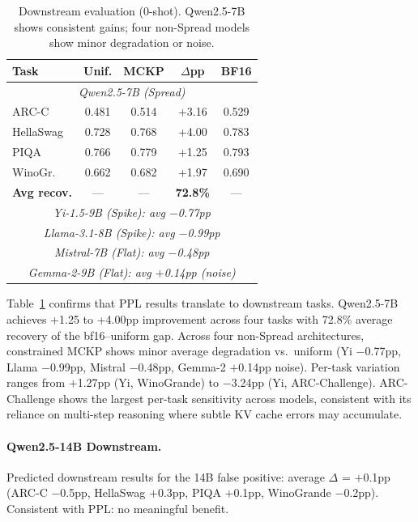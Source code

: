 \documentclass[11pt,a4paper]{article}
\begin{document}
\begin{table}[t]
\centering
\small
\begin{tabular}{lcccc}
\toprule
\textbf{Task} & \textbf{Unif.} & \textbf{MCKP} & $\Delta$\textbf{pp} & \textbf{BF16} \\
\midrule
\multicolumn{5}{c}{\emph{Qwen2.5-7B (Spread)}} \\
ARC-C     & 0.481 & 0.514 & +3.16 & 0.529 \\
HellaSwag & 0.728 & 0.768 & +4.00 & 0.783 \\
PIQA      & 0.766 & 0.779 & +1.25 & 0.793 \\
WinoGr.   & 0.662 & 0.682 & +1.97 & 0.690 \\
\textbf{Avg recov.} & --- & --- & \textbf{72.8\%} & --- \\
\midrule
\multicolumn{5}{c}{\emph{Yi-1.5-9B (Spike): avg $-$0.77pp}} \\
\multicolumn{5}{c}{\emph{Llama-3.1-8B (Spike): avg $-$0.99pp}} \\
\multicolumn{5}{c}{\emph{Mistral-7B (Flat): avg $-$0.48pp}} \\
\multicolumn{5}{c}{\emph{Gemma-2-9B (Flat): avg $+$0.14pp (noise)}} \\
\bottomrule
\end{tabular}
\caption{Downstream evaluation (0-shot). Qwen2.5-7B shows consistent gains; four non-Spread models show minor degradation or noise.}
\label{tab:downstream}
\end{table}

Table~\ref{tab:downstream} confirms that PPL results translate to downstream tasks.
Qwen2.5-7B achieves +1.25 to +4.00pp improvement across four tasks with 72.8\% average recovery of the bf16--uniform gap.
Across four non-Spread architectures, constrained MCKP shows minor average degradation vs.\ uniform (Yi $-$0.77pp, Llama $-$0.99pp, Mistral $-$0.48pp, Gemma-2 $+$0.14pp noise).
Per-task variation ranges from $+$1.27pp (Yi, WinoGrande) to $-$3.24pp (Yi, ARC-Challenge).
ARC-Challenge shows the largest per-task sensitivity across models, consistent with its reliance on multi-step reasoning where subtle KV cache errors may accumulate.

\paragraph{Qwen2.5-14B Downstream.}
Predicted downstream results for the 14B false positive: average $\Delta$ = $+$0.1pp (ARC-C $-$0.5pp, HellaSwag $+$0.3pp, PIQA $+$0.1pp, WinoGrande $-$0.2pp). Consistent with PPL: no meaningful benefit.
\end{document}
